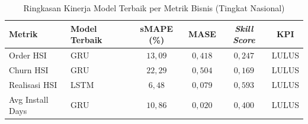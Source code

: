 \begin{table}[htbp]
\centering
\caption{Ringkasan Kinerja Model Terbaik per Metrik Bisnis (Tingkat Nasional)}
\label{tab:ringkasan-forecasting}
\begin{tabular}{|p{3cm}|p{1.8cm}|c|c|c|c|}
\hline
\textbf{Metrik} & \textbf{Model Terbaik} & \textbf{sMAPE (\%)} & \textbf{MASE} & \textbf{\textit{Skill Score}} & \textbf{KPI} \\
\hline
Order HSI & GRU & $13{,}09$ & $0{,}418$ & $0{,}247$ & LULUS \\
\hline
Churn HSI & GRU & $22{,}29$ & $0{,}504$ & $0{,}169$ & LULUS \\
\hline
Realisasi HSI & LSTM & $6{,}48$ & $0{,}079$ & $0{,}593$ & LULUS \\
\hline
Avg Install Days & GRU & $10{,}86$ & $0{,}020$ & $0{,}400$ & LULUS \\
\hline
\end{tabular}
\end{table}
